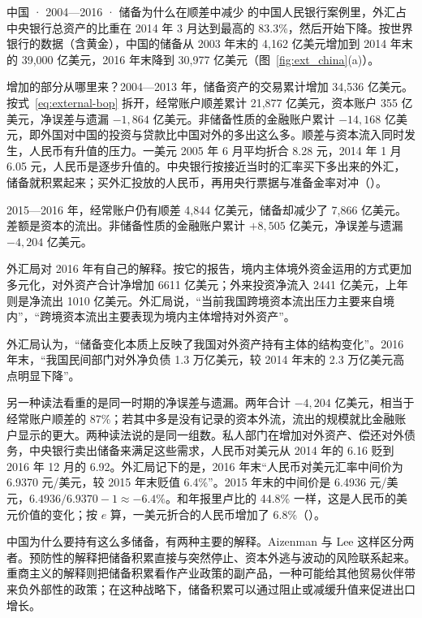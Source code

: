 \begin{case}{中国 · 2004—2016 · 储备为什么在顺差中减少}
的中国人民银行案例里，外汇占中央银行总资产的比重在 2014 年 3 月达到最高的 83.3\%，然后开始下降。按世界银行的数据（含黄金），中国的储备从 2003 年末的 4,162 亿美元增加到 2014 年末的 39,000 亿美元，2016 年末降到 30,977 亿美元（图~\ref{fig:ext_china}(a)）\cite{wdi2026}。

增加的部分从哪里来？2004—2013 年，储备资产的交易累计增加 34,536 亿美元。按式~\eqref{eq:external-bop} 拆开，经常账户顺差累计 21,877 亿美元，资本账户 355 亿美元，净误差与遗漏 $-1,864$ 亿美元。非储备性质的金融账户累计 $-14,168$ 亿美元，即外国对中国的投资与贷款比中国对外的多出这么多\cite{wdi2026}。顺差与资本流入同时发生，人民币有升值的压力。一美元 2005 年 6 月平均折合 8.28 元，2014 年 1 月 6.05 元，人民币是逐步升值的\cite{bis2026}。中央银行按接近当时的汇率买下多出来的外汇，储备就积累起来；买外汇投放的人民币，再用央行票据与准备金率对冲（）。

2015—2016 年，经常账户仍有顺差 4,844 亿美元，储备却减少了 7,866 亿美元。差额是资本的流出。非储备性质的金融账户累计 $+8,505$ 亿美元，净误差与遗漏 $-4,204$ 亿美元\cite{wdi2026}。

外汇局对 2016 年有自己的解释。按它的报告，境内主体境外资金运用的方式更加多元化，对外资产合计净增加 6611 亿美元；外来投资净流入 2441 亿美元，上年则是净流出 1010 亿美元。外汇局说，“当前我国跨境资本流出压力主要来自境内”，“跨境资本流出主要表现为境内主体增持对外资产”\cite{safe2017}。

外汇局认为，“储备变化本质上反映了我国对外资产持有主体的结构变化”。2016 年末，“我国民间部门对外净负债 1.3 万亿美元，较 2014 年末的 2.3 万亿美元高点明显下降”\cite{safe2017}。

另一种读法看重的是同一时期的净误差与遗漏。两年合计 $-4,204$ 亿美元，相当于经常账户顺差的 87\%；若其中多是没有记录的资本外流，流出的规模就比金融账户显示的更大。两种读法说的是同一组数。私人部门在增加对外资产、偿还对外债务，中央银行卖出储备来满足这些需求，人民币对美元从 2014 年的 6.16 贬到 2016 年 12 月的 6.92\cite{bis2026}。外汇局记下的是，2016 年末“人民币对美元汇率中间价为 6.9370 元/美元，较 2015 年末贬值 6.4\%”\cite{safe2017}。2015 年末的中间价是 6.4936 元/美元\cite{safe2016ar}，$6.4936/6.9370-1\approx-6.4\%$。和年报里卢比的 44.8\% 一样，这是人民币的美元价值的变化；按 $e$ 算，一美元折合的人民币增加了 6.8\%（）。

中国为什么要持有这么多储备，有两种主要的解释。Aizenman 与 Lee 这样区分两者。预防性的解释把储备积累直接与突然停止、资本外逃与波动的风险联系起来。重商主义的解释则把储备积累看作产业政策的副产品，一种可能给其他贸易伙伴带来负外部性的政策；在这种战略下，储备积累可以通过阻止或减缓升值来促进出口增长\cite{aizenman2007}。


\end{case}
